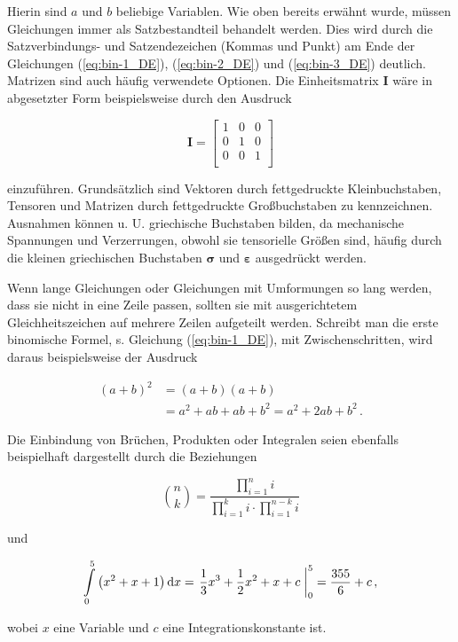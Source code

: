Hierin sind $a$ und $b$ beliebige Variablen. Wie oben bereits erwähnt wurde, müssen Gleichungen immer als Satzbestandteil behandelt werden. Dies wird durch die Satzverbindungs- und Satzendezeichen (Kommas und Punkt) am Ende der Gleichungen (\ref{eq:bin-1_DE}), (\ref{eq:bin-2_DE}) und (\ref{eq:bin-3_DE}) deutlich. Matrizen sind auch häufig verwendete Optionen. Die Einheitsmatrix $\mathbf{I}$ wäre in abgesetzter Form beispielsweise durch den Ausdruck

\begin{equation}
	\mathbf{I} = 
	\left[ \begin{matrix}
		1 & 0 & 0 \\
		0 & 1 & 0 \\
		0 & 0 & 1 \\
	\end{matrix} \right]
\end{equation}

einzuführen. Grundsätzlich sind Vektoren durch fettgedruckte Kleinbuchstaben, Tensoren und Matrizen durch fettgedruckte Großbuchstaben zu kennzeichnen. Ausnahmen können u. U. griechische Buchstaben bilden, da mechanische Spannungen und Verzerrungen, obwohl sie tensorielle Größen sind, häufig durch die kleinen griechischen Buchstaben $\boldsymbol{\sigma}$ und $\boldsymbol{\varepsilon}$ ausgedrückt werden.

Wenn lange Gleichungen oder Gleichungen mit Umformungen so lang werden, dass sie nicht in eine Zeile passen, sollten sie mit ausgerichtetem Gleichheitszeichen auf mehrere Zeilen aufgeteilt werden. Schreibt man die erste binomische Formel, s. Gleichung (\ref{eq:bin-1_DE}),  mit Zwischenschritten, wird daraus beispielsweise der Ausdruck

\begin{equation}
	\begin{split}
		(a+b)^2 &= (a+b)(a+b)\\
		&= a^2 + ab + ab + b^2 = a^2 + 2ab + b^2 \,.
	\end{split}
\end{equation}

Die Einbindung von Brüchen, Produkten oder Integralen seien ebenfalls beispielhaft dargestellt durch die Beziehungen

\begin{equation}
	\binom{n}{k} = \frac{\displaystyle\prod_{i=1}^n i}{\displaystyle\prod_{i=1}^k i\cdot
		\prod_{i=1}^{n-k} i}
\end{equation}

und

\begin{equation}
	\int_0^5\limits \left(x^2 +x+1\right) \mathrm{d}x = \left. \frac{1}{3} x^3 + \frac{1}{2} x^2 + x + c \; \right|_0^5 = \frac{355}{6} + c \, ,
\end{equation}

wobei $x$ eine Variable und $c$ eine Integrationskonstante ist.